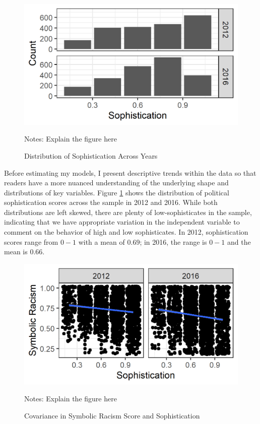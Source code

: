 \documentclass[12pt]{paper}
\begin{document}
\begin{figure}[H]
	\centering
	\includegraphics[scale=1]{fig/sophistication-desc.png}
	{\singlespacing
		\parbox{0.78\textwidth}{\scriptsize%
			Notes: Explain the figure here
	}}
	\caption{Distribution of Sophistication Across Years}
	\label{soph}
\end{figure}

Before estimating my models, I present descriptive trends within the data so that readers have a more nuanced understanding of the underlying shape and distributions of key variables. Figure \ref{soph} shows the distribution of political sophistication scores across the sample in 2012 and 2016. While both distributions are left skewed, there are plenty of low-sophisticates in the sample, indicating that we have appropriate variation in the independent variable to comment on the behavior of high and low sophisticates. In 2012, sophistication scores range from $0-1$ with a mean of $0.69$; in 2016, the range is $0-1$ and the mean is $0.66$.

\begin{figure}[H]
	\centering
	\includegraphics[scale=1]{fig/symbolic-racism-desc.png}
	{\singlespacing
		\parbox{0.78\textwidth}{\scriptsize%
			Notes: Explain the figure here
	}}
	\caption{Covariance in Symbolic Racism Score and Sophistication}
	\label{symbol-rac}
\end{figure}
\end{document}

